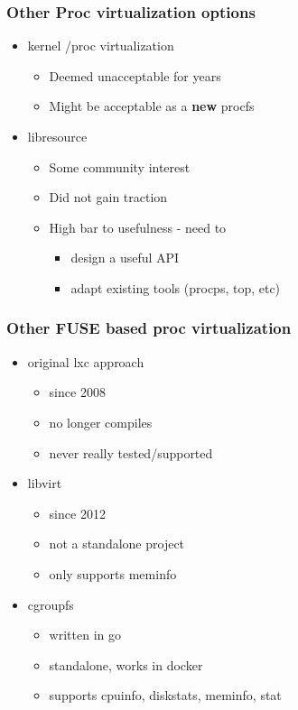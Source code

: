 \documentclass{beamer}
\begin{document}
\begin{frame}
\frametitle{Other Proc virtualization options}
\begin{itemize}
\item kernel /proc virtualization
	\begin{itemize}
	\item Deemed unacceptable for years
	\item Might be acceptable as a {\bf new} procfs
	\end{itemize}
\item libresource
	\begin{itemize}
	\item Some community interest
	\item Did not gain traction
	\item High bar to usefulness - need to
		\begin{itemize}
		\item design a useful API
		\item adapt existing tools (procps, top, etc)
		\end{itemize}
	\end{itemize}
\end{itemize}
\end{frame}

\begin{frame}
\frametitle{Other FUSE based proc virtualization}
	\begin{itemize}
	\item original lxc approach
		\begin{itemize}
		\item since 2008
		\item no longer compiles
		\item never really tested/supported
		\end{itemize}
	\item libvirt
		\begin{itemize}
		\item since 2012
		\item not a standalone project
		\item only supports meminfo
		\end{itemize}
	\item cgroupfs
		\begin{itemize}
		\item written in go
		\item standalone, works in docker
		\item supports cpuinfo, diskstats, meminfo, stat
		\end{itemize}
	\end{itemize}
\end{frame}
\end{document}
